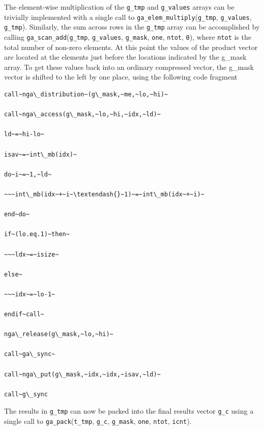 The element-wise multiplication of the \texttt{g\_tmp} and \texttt{g\_values}
arrays can be trivially implemented with a single call to \texttt{ga\_elem\_multiply}(\texttt{g\_tmp},
\texttt{g\_values},\texttt{ g\_tmp}). Similarly, the sum across rows
in the \texttt{g\_tmp} array can be accomplished by calling \texttt{ga\_scan\_add}(\texttt{g\_tmp},
\texttt{g\_values}, \texttt{g\_mask}, \texttt{one}, \texttt{ntot},
\texttt{0}), where \texttt{ntot} is the total number of non-zero elements.
At this point the values of the product vector are located at the
elements just before the locations indicated by the g\_mask array.
To get these values back into an ordinary compressed vector, the g\_mask
vector is shifted to the left by one place, using the following code
fragment
\begin{verbatim}
call~nga\_distribution~(g\_mask,~me,~lo,~hi)~

call~nga\_access(g\_mask,~lo,~hi,~idx,~ld)~

ld~=~hi-lo~

isav~=~int\_mb(idx)~

do~i~=~1,~ld~

~~~int\_mb(idx~+~i~\textendash{}~1)~=~int\_mb(idx~+~i)~

end~do~

if~(lo.eq.1)~then~

~~~ldx~=~isize~

else~

~~~idx~=~lo-1~

endif~call~

nga\_release(g\_mask,~lo,~hi)~

call~ga\_sync~

call~nga\_put(g\_mask,~idx,~idx,~isav,~ld)~

call~g\_sync
\end{verbatim}
The results in \texttt{g\_tmp} can now be packed into the final results
vector \texttt{g\_c} using a single call to \texttt{ga\_pack}(\texttt{t\_tmp},
\texttt{g\_c}, \texttt{g\_mask}, \texttt{one}, \texttt{ntot}, \texttt{icnt}). 
